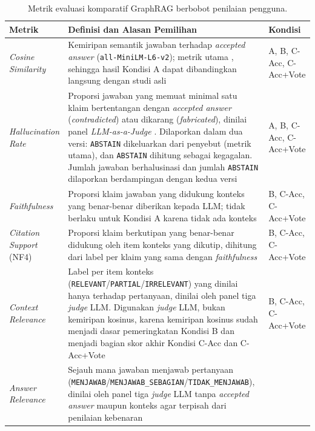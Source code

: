 \begin{table}[!htbp]
\centering
\footnotesize
\caption{Metrik evaluasi komparatif GraphRAG berbobot penilaian pengguna.}
\label{tab:metrik-evaluasi}
\renewcommand{\arraystretch}{1.2}
\begin{tabularx}{\textwidth}{|>{\raggedright\arraybackslash}p{3.2cm}|>{\raggedright\arraybackslash}X|>{\raggedright\arraybackslash}p{2.2cm}|}
\hline
\textbf{Metrik} & \textbf{Definisi dan Alasan Pemilihan} & \textbf{Kondisi} \\
\hline
\emph{Cosine Similarity} &
    Kemiripan semantik jawaban terhadap \emph{accepted answer} (\texttt{all-MiniLM-L6-v2}); metrik utama \textcite{DaSilva2025}, sehingga hasil Kondisi A dapat dibandingkan langsung dengan studi asli &
    A, B, C-Acc, C-Acc+Vote \\
\hline
\emph{Hallucination Rate} &
    Proporsi jawaban yang memuat minimal satu klaim bertentangan dengan \emph{accepted answer} (\emph{contradicted}) atau dikarang (\emph{fabricated}), dinilai panel \emph{LLM-as-a-Judge} \autocite{Gu2026}. Dilaporkan dalam dua versi: \texttt{ABSTAIN} dikeluarkan dari penyebut (metrik utama), dan \texttt{ABSTAIN} dihitung sebagai kegagalan. Jumlah jawaban berhalusinasi dan jumlah \texttt{ABSTAIN} dilaporkan berdampingan dengan kedua versi &
    A, B, C-Acc, C-Acc+Vote \\
\hline
\emph{Faithfulness} &
    Proporsi klaim jawaban yang didukung konteks yang benar-benar diberikan kepada LLM; tidak berlaku untuk Kondisi A karena tidak ada konteks &
    B, C-Acc, C-Acc+Vote \\
\hline
\emph{Citation Support} (NF4) &
    Proporsi klaim berkutipan yang benar-benar didukung oleh item konteks yang dikutip, dihitung dari label per klaim yang sama dengan \emph{faithfulness} &
    B, C-Acc, C-Acc+Vote \\
\hline
\emph{Context Relevance} &
    Label per item konteks (\texttt{RELEVANT}/\texttt{PARTIAL}/\texttt{IRRELEVANT}) yang dinilai hanya terhadap pertanyaan, dinilai oleh panel tiga \emph{judge} LLM. Digunakan \emph{judge} LLM, bukan kemiripan kosinus, karena kemiripan kosinus sudah menjadi dasar pemeringkatan Kondisi B dan menjadi bagian skor akhir Kondisi C-Acc dan C-Acc+Vote &
    B, C-Acc, C-Acc+Vote \\
\hline
\emph{Answer Relevance} &
    Sejauh mana jawaban menjawab pertanyaan (\texttt{MENJAWAB}/\texttt{MENJAWAB\_SEBAGIAN}/\texttt{TIDAK\_MENJAWAB}), dinilai oleh panel tiga \emph{judge} LLM tanpa \emph{accepted answer} maupun konteks agar terpisah dari penilaian kebenaran &

\end{tabularx}
\end{table}
